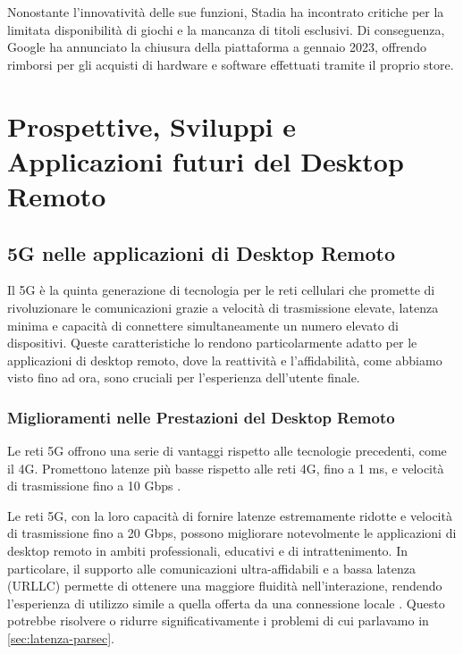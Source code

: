 \documentclass[12pt,a4paper,openright,twoside]{book}
\begin{document}
Nonostante l'innovatività delle sue funzioni, Stadia ha incontrato critiche per la limitata disponibilità di giochi e la mancanza di titoli esclusivi. Di conseguenza, Google ha annunciato la chiusura della piattaforma a gennaio 2023, offrendo rimborsi per gli acquisti di hardware e software effettuati tramite il proprio store.




\chapter{Prospettive, Sviluppi e Applicazioni futuri del Desktop Remoto}


\section{5G nelle applicazioni di Desktop Remoto}
\label{sec:5g}

Il 5G è la quinta generazione di tecnologia per le reti cellulari che promette di rivoluzionare le comunicazioni grazie a velocità di trasmissione elevate, latenza minima e capacità di connettere simultaneamente un numero elevato di dispositivi. Queste caratteristiche lo rendono particolarmente adatto per le applicazioni di desktop remoto, dove la reattività e l'affidabilità, come abbiamo visto fino ad ora, sono cruciali per l'esperienza dell'utente finale.

\subsection{Miglioramenti nelle Prestazioni del Desktop Remoto}

Le reti 5G offrono una serie di vantaggi rispetto alle tecnologie precedenti, come il 4G. Promettono latenze più basse rispetto alle reti 4G, fino a 1 ms, e velocità di trasmissione fino a 10 Gbps \cite{Dangi2021}. 

Le reti 5G, con la loro capacità di fornire latenze estremamente ridotte e velocità di trasmissione fino a 20 Gbps, possono migliorare notevolmente le applicazioni di desktop remoto in ambiti professionali, educativi e di intrattenimento. In particolare, il supporto alle comunicazioni ultra-affidabili e a bassa latenza (URLLC) permette di ottenere una maggiore fluidità nell’interazione, rendendo l’esperienza di utilizzo simile a quella offerta da una connessione locale \cite{Dangi2021, Sahu2024}. Questo potrebbe risolvere o ridurre significativamente i problemi di cui parlavamo in \ref{sec:latenza-parsec}.
\end{document}
